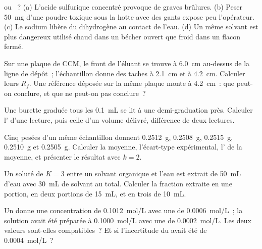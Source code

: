 \begin{exercise}[$\star$]\label{exo:b1:lab-techniques-1:2}
 ou ~? (a) L'acide sulfurique concentré provoque de graves
brûlures.
(b) Peser \qty{50}{mg} d'une poudre toxique sous la hotte avec des
gants expose peu l'opérateur. (c) Le sodium libère du dihydrogène au
contact de l'eau. (d) Un même solvant est plus dangereux utilisé chaud
dans un bécher ouvert que froid dans un flacon fermé.
\end{exercise}

\begin{exercise}[$\star$]\label{exo:b1:lab-techniques-1:3}
Sur une plaque de CCM, le front de l'éluant se trouve à \qty{6.0}{cm}
au-dessus de la ligne de dépôt~;
l'échantillon donne des taches à \qty{2.1}{cm} et à \qty{4.2}{cm}.
Calculer leurs
$R_f$. Une référence déposée sur la même plaque monte à \qty{4.2}{cm}~:
que peut-on conclure, et que ne peut-on pas conclure~?
\end{exercise}

\begin{exercise}[$\star$]\label{exo:b1:lab-techniques-1:4}
Une burette graduée tous les \qty{0.1}{mL} se lit à une
demi-graduation près. Calculer l' d'une lecture, puis
celle d'un volume délivré, différence de deux lectures.
\end{exercise}

\begin{exercise}[$\star\star$]\label{exo:b1:lab-techniques-1:5}
Cinq pesées d'un même échantillon donnent \qty{0.2512}{g}, \qty{0.2508}{g},
\qty{0.2515}{g}, \qty{0.2510}{g} et \qty{0.2505}{g}. Calculer la moyenne,
l'écart-type expérimental, l' de la moyenne, et
présenter le résultat avec $k = 2$.
\end{exercise}

\begin{exercise}[$\star\star$]\label{exo:b1:lab-techniques-1:6}
Un soluté de  $K = 3$ entre un solvant organique
et l'eau est extrait de \qty{50}{mL} d'eau avec \qty{30}{mL} de solvant
au total. Calculer la fraction extraite en une portion, en deux portions
de \qty{15}{mL}, et en trois de \qty{10}{mL}.
\end{exercise}

\begin{exercise}[$\star\star$]\label{exo:b1:lab-techniques-1:7}
Un  donne une concentration de \qty{0.1012}{mol/L} avec une
 de \qty{0.0006}{mol/L}~; la solution avait été
préparée à \qty{0.1000}{mol/L} avec une  de
\qty{0.0002}{mol/L}. Les deux valeurs sont-elles compatibles~? Et si
l'incertitude du  avait été de
\qty{0.0004}{mol/L}~?
\end{exercise}

